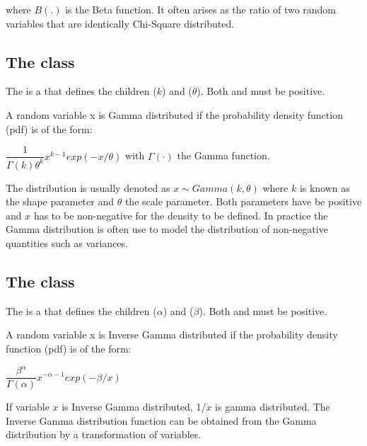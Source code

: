 where $B(.)$ is the Beta function. It often arises as the ratio of two random variables that are identically Chi-Square distributed.

\subsection{The  class}
\label{GammaDistribution-class}
\label{gammadistribution-class}

The \GammaDistribution is a \ContinuousUnivariateDistribution that defines the \UncertValue children  ($k$) and  ($\theta$).  Both  and  must be positive.

A random variable x is Gamma distributed if the probability density function (pdf) is of the form:

\begin{center}
$\dfrac{1}{\Gamma(k) \theta^k} x^{k-1} exp(-x/\theta) $ with $ \Gamma(\cdot) $ the Gamma function.
\end{center}

The distribution is usually denoted as $x \sim Gamma(k, \theta)$ where $k$ is known as the shape parameter and $\theta$ the scale parameter. Both parameters have be positive and $x$ has to be non-negative for the density to be defined. In practice the Gamma distribution is often use to model the distribution of non-negative quantities such as variances.

\subsection{The  class}
\label{InverseGammaDistribution-class}
\label{inversegammadistribution-class}

The \InverseGammaDistribution is a \ContinuousUnivariateDistribution that defines the \UncertValue children  ($\alpha$) and  ($\beta$).  Both  and  must be positive.

A random variable x is Inverse Gamma distributed if the probability density function (pdf) is of the form:

\begin{center}
$\dfrac{\beta^\alpha}{\Gamma(\alpha)}x^{-\alpha-1}exp(-\beta/x)$
\end{center}

If variable $x$ is Inverse Gamma distributed, 1/$x$ is gamma distributed. The Inverse Gamma distribution function can be obtained from the Gamma distribution by a transformation of variables.

